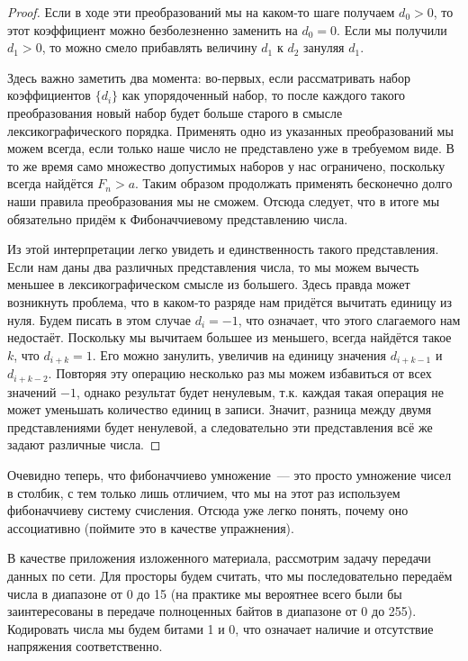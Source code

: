 \begin{proof}
Если в ходе эти преобразований мы на каком-то шаге получаем $d_0 > 0$, то этот коэффициент можно безболезненно заменить на $d_0 = 0$. Если мы получили $d_1 > 0$, то можно смело прибавлять величину $d_1$ к $d_2$ зануляя $d_1$.

Здесь важно заметить два момента: во-первых, если рассматривать набор коэффициентов $\{d_i\}$ как упорядоченный набор, то после каждого такого преобразования новый набор будет больше старого в смысле лексикографического порядка. Применять одно из указанных преобразований мы можем всегда, если только наше число не представлено уже в требуемом виде. В то же время само множество допустимых наборов у нас ограничено, поскольку всегда найдётся $F_n > a$. Таким образом продолжать применять бесконечно долго наши правила преобразования мы не сможем. Отсюда следует, что в итоге мы обязательно придём к Фибоначчиевому представлению числа.

Из этой интерпретации легко увидеть и единственность такого представления. Если нам даны два различных представления числа, то мы можем вычесть меньшее в лексикографическом смысле из большего. Здесь правда может возникнуть проблема, что в каком-то разряде нам придётся вычитать единицу из нуля. Будем писать в этом случае $d_i =-1$, что означает, что этого слагаемого нам недостаёт. Поскольку мы вычитаем большее из меньшего, всегда найдётся такое $k$, что $d_{i+k} = 1$. Его можно занулить, увеличив на единицу значения $d_{i+k - 1}$ и $d_{i+k-2}$. Повторяя эту операцию несколько раз мы можем избавиться от всех значений $-1$, однако результат будет ненулевым, т.к. каждая такая операция не может уменьшать количество единиц в записи. Значит, разница между двумя представлениями будет ненулевой, а следовательно эти представления всё же задают различные числа.
\end{proof}

Очевидно теперь, что фибоначчиево умножение~--- это просто умножение чисел в столбик, с тем только лишь отличием, что мы на этот раз используем фибоначчиеву систему счисления. Отсюда уже легко понять, почему оно ассоциативно (поймите это в качестве упражнения).

В качестве приложения изложенного материала, рассмотрим задачу передачи данных по сети. Для просторы будем считать, что мы последовательно передаём числа в диапазоне от 0 до 15 (на практике мы вероятнее всего были бы заинтересованы в передаче полноценных байтов в диапазоне от 0 до 255). Кодировать числа мы будем битами 1 и 0, что означает наличие и отсутствие напряжения соответственно.


